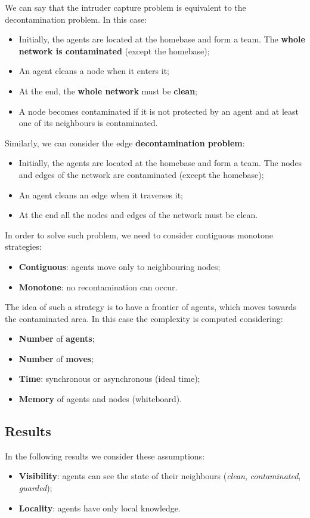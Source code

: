 We can say that the intruder capture problem is equivalent to the decontamination problem. In this case:
\begin{itemize}
    \item Initially, the agents are located at the homebase and form a team. The \textbf{whole network is contaminated} (except the homebase);
    \item An agent cleans a node when it enters it;
    \item At the end, the \textbf{whole network }must be \textbf{clean};
    \item A node becomes contaminated if it is not protected by an agent and at least one of its neighbours is contaminated.
\end{itemize}

Similarly, we can consider the edge \textbf{decontamination problem}:
\begin{itemize}
    \item Initially, the agents are located at the homebase and form a team. The nodes and edges of the network are contaminated (except the homebase);
    \item An agent cleans an edge when it traverses it;
    \item At the end all the nodes and edges of the network must be clean.
\end{itemize}

In order to solve such problem, we need to consider contiguous monotone strategies:
\begin{itemize}
    \item \textbf{Contiguous}: agents move only to neighbouring nodes;
    \item \textbf{Monotone}: no recontamination can occur.
\end{itemize}

The idea of such a strategy is to have a frontier of agents, which moves towards the contaminated area. In this case the complexity is computed considering:
\begin{itemize}
    \item \textbf{Number} of \textbf{agents};
    \item \textbf{Number} of \textbf{moves};
    \item \textbf{Time}: synchronous or asynchronous (ideal time);
    \item \textbf{Memory} of agents and nodes (whiteboard).
\end{itemize}

\subsection{Results}
In the following results we consider these assumptions:
\begin{itemize}
    \item \textbf{Visibility}: agents can see the state of their neighbours (\textit{clean}, \textit{contaminated}, \textit{guarded});
    \item \textbf{Locality}: agents have only local knowledge.
\end{itemize}

